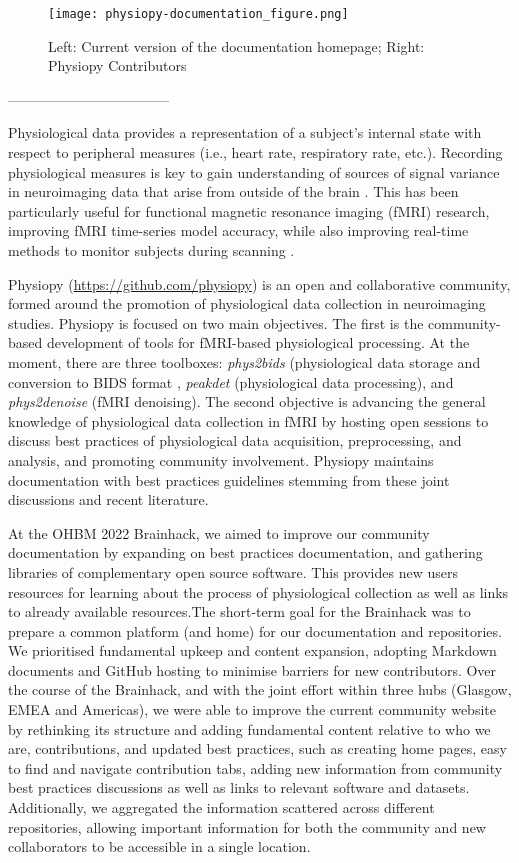 \documentclass[../main.tex]{subfiles}
\begin{document}
\begin{figure}
	\centering
	\texttt{[image: physiopy-documentation\_figure.png]}
	\caption{Left: Current version of the documentation homepage; Right: Physiopy Contributors}
	\label{fig:physiopy_beforeafter}
\end{figure}

-----------------------------------

Physiological data provides a representation of a subject’s internal state with respect to peripheral measures (i.e., heart rate, respiratory rate, etc.). Recording physiological measures is key to gain understanding of sources of signal variance in neuroimaging data that arise from outside of the brain \parencite{chen2020}. This has been particularly useful for functional magnetic resonance imaging (fMRI) research, improving fMRI time-series model accuracy, while also improving real-time methods to monitor subjects during scanning \parencite{bulte2017, caballero-gaudes2017}. 

Physiopy (\url{https://github.com/physiopy}) is an open and collaborative community, formed around the promotion of physiological data collection in neuroimaging studies. Physiopy is focused on two main objectives. The first is the community-based development of tools for fMRI-based physiological processing. At the moment, there are three toolboxes: \textit{phys2bids} (physiological data storage and conversion to BIDS format \parencite{phys2bids}, \textit{peakdet} (physiological data processing), and \textit{phys2denoise} (fMRI denoising). The second objective is advancing the general knowledge of physiological data collection in fMRI by hosting open sessions to discuss best practices of physiological data acquisition, preprocessing, and analysis, and promoting community involvement. Physiopy maintains documentation with best practices guidelines stemming from these joint discussions and recent literature.

At the OHBM 2022 Brainhack, we aimed to improve our community documentation by expanding on best practices documentation, and gathering libraries of complementary open source software. This provides new users resources for learning about the process of physiological collection as well as links to already available resources.The short-term goal for the Brainhack was to prepare a common platform (and home) for our documentation and repositories. We prioritised fundamental upkeep and content expansion, adopting Markdown documents and GitHub hosting to minimise barriers for new contributors. Over the course of the Brainhack, and with the joint effort within three hubs (Glasgow, EMEA and Americas), we were able to improve the current community website by rethinking its structure and adding fundamental content relative to who we are, contributions, and updated best practices, such as creating home pages, easy to find and navigate contribution tabs, adding new information from community best practices discussions as well as links to relevant software and datasets. Additionally, we  aggregated the information scattered across different repositories, allowing important information for both the community and new collaborators to be accessible in a single location. 
\end{document}
